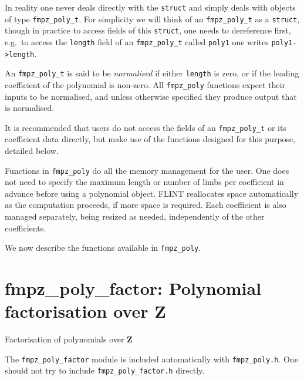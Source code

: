 \documentclass[a4paper,10pt]{book}
\newcommand{\Z}{\mathbf{Z}}%
\newcommand{\code}{\lstinline}
\begin{document}
{{In reality one never deals directly with the \code{struct} and simply deals
with objects of type \code{fmpz_poly_t}.  For simplicity we will think of an
\code{fmpz_poly_t} as a \code{struct}, though in practice to access fields
of this \code{struct}, one needs to dereference first, e.g.\ to access the
\code{length} field of an \code{fmpz_poly_t} called \code{poly1} one writes
\code{poly1->length}.

An \code{fmpz_poly_t} is said to be \emph{normalised} if either
\code{length} is zero, or if the leading coefficient of the polynomial is
non-zero.  All \code{fmpz_poly} functions expect their inputs to be
normalised, and unless otherwise specified they produce output that is
normalised.

It is recommended that users do not access the fields of an
\code{fmpz_poly_t} or its coefficient data directly, but make use of the
functions designed for this purpose, detailed below.

Functions in \code{fmpz_poly} do all the memory management for the user.
One does not need to specify the maximum length or number of limbs per
coefficient in advance before using a polynomial object.  FLINT reallocates
space automatically as the computation proceeds, if more space is required.
Each coefficient is also managed separately, being resized as needed,
independently of the other coefficients.

We now describe the functions available in \code{fmpz_poly}.




\chapter{fmpz\_poly\_factor: Polynomial factorisation over $\Z$}
\epigraph{Factorisation of polynomials over $\Z$}{}

The \code{fmpz_poly_factor} module is included automatically with
\code{fmpz_poly.h}. One should not try to include \code{fmpz_poly_factor.h}
directly.




}}
\end{document}

